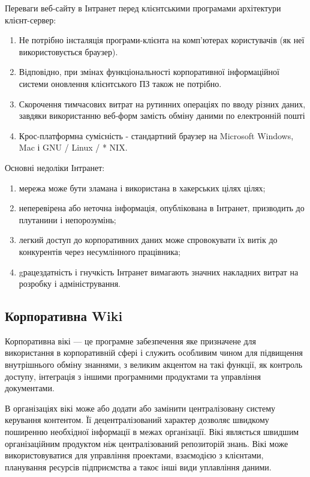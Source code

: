Переваги веб-сайту в Інтранет перед клієнтськими програмами архітектури клієнт-сервер:
\begin{enumerate}
\item Не потрібно інсталяція програми-клієнта на комп'ютерах користувачів (як неї використовується браузер).
\item Відповідно, при змінах функціональності корпоративної інформаційної системи оновлення клієнтського ПЗ також не потрібно.
\item  Скорочення тимчасових витрат на рутинних операціях по вводу різних даних, завдяки використанню веб-форм замість обміну даними по електронній пошті
\item Крос-платформна сумісність - стандартний браузер на Microsoft Windows, Mac і GNU / Linux / * NIX.
\end{enumerate}


Основні недоліки Інтранет:
\begin{enumerate}
\item мережа може бути зламана і використана в хакерських цілях цілях;
\item неперевірена або неточна інформація, опублікована в Інтранет, призводить до плутанини і непорозумінь;
\item легкий доступ до корпоративних даних може спровокувати їх витік до конкурентів через несумлінного працівника;
\item gрацездатність і гнучкість Інтранет вимагають значних накладних витрат на розробку і адміністрування.
\end{enumerate}








\subsection{Корпоративна Wiki}

Корпоративна вікі --- це програмне забезпечення яке призначене для використання в корпоративній сфері і служить особливим чином для підвищення внутрішнього обміну знаннями, з великим акцентом на такі функції, як контроль доступу, інтеграція з іншими програмними продуктами та управління документами. 
\par В організаціях вікі може або додати або замінити централізовану систему керування контентом. 
Її децентралізований характер дозволяє швидкому поширенню необхідної інформації в межах організації.
Вікі являється швидшим організаційним продуктом ніж централізований репозиторій знань.
Вікі може використовуватися для управління проектами, взаємодією з клієнтами, планування ресурсів підприємства а такоє інші види уплавління даними.

